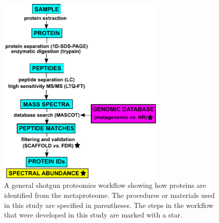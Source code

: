 \begin{figure}
\centering
\includegraphics[width=80mm]{ace_figures/workflow.pdf}
\caption[General shotgun proteomics workflow]{A general shotgun proteomics workflow showing how proteins are identified from the metaproteome. The procedures or materials used in this study are specified in parentheses. The steps in the workflow that were developed in this study are marked with a star.
}
\label{fig:workflow}

\end{figure}
